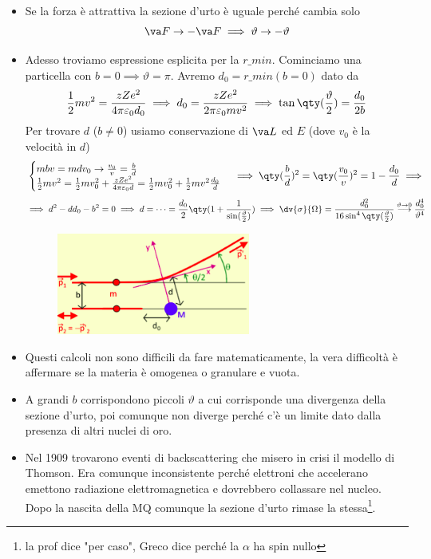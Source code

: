     \begin{itemize}
    \item Se la forza è attrattiva la sezione d'urto è uguale perché cambia solo
        \begin{equation*}
    \va F\to -\va F\implies\vartheta\to-\vartheta
    \end{equation*}
    \item Adesso troviamo espressione esplicita per la $r\_{min}$. Cominciamo una particella con $b=0\implies \vartheta=\pi$. Avremo $d_0=r\_{min}(b=0)$ dato da
    \begin{equation*}
    \frac12mv^2=\frac{zZe^2}{4\pi\varepsilon_0d_0}\implies d_0=\frac{zZe^2}{2\pi\varepsilon_0mv^2}\implies \tan\qty(\frac\vartheta2)=\frac{d_0}{2b}
    \end{equation*}
    Per trovare $d$ ($b\neq0$) usiamo conservazione di $\va L$ ed $E$ (dove $v_0$ è la velocità in $d$)
    \begin{equation*}
        \begin{cases}
        mbv=mdv_0\to \frac{v_0}v=\frac bd\\
        \frac12mv^2=\frac12mv_0^2+\frac{zZe^2}{4\pi\varepsilon_0d}=\frac12mv_0^2+\frac12mv^2\frac{d_0}d
        \end{cases}\implies\qty(\frac bd)^2=\qty(\frac{v_0}v)^2=1-\frac{d_0}d\implies 
    \end{equation*}
    \begin{equation*}
        \implies d^2-dd_0-b^2=0\implies d=\dots=\frac{d_0}2\qty(1+\frac1{\sin(\frac\vartheta2)})\implies \dv{\sigma}{\Omega}= \frac{d_0^2}{16\sin^4\qty(\frac\vartheta2)}\overset{\vartheta\to0}{\longrightarrow}\frac{d_0^4}{\vartheta^4}
    \end{equation*}
    \begin{figure}[H]
        \centering
        \includegraphics[width=0.6\textwidth]{immagini/fig_ruth_b_nullo.png}
    \end{figure}
    \item Questi calcoli non sono difficili da fare matematicamente, la vera difficoltà è affermare se la materia è omogenea o granulare e vuota.
    \item A grandi $b$ corrispondono piccoli $\vartheta$ a cui corrisponde una divergenza della sezione d'urto, poi comunque non diverge perché c'è un limite dato dalla presenza di altri nuclei di oro. 
    \item Nel 1909 trovarono eventi di backscattering che misero in crisi il modello di Thomson. Era comunque inconsistente perché elettroni che accelerano emettono radiazione elettromagnetica e dovrebbero collassare nel nucleo. Dopo la nascita della MQ comunque la sezione d'urto rimase la stessa\footnote{la prof dice "per caso", Greco dice perché la $\alpha$ ha spin nullo}.
\end{itemize}
